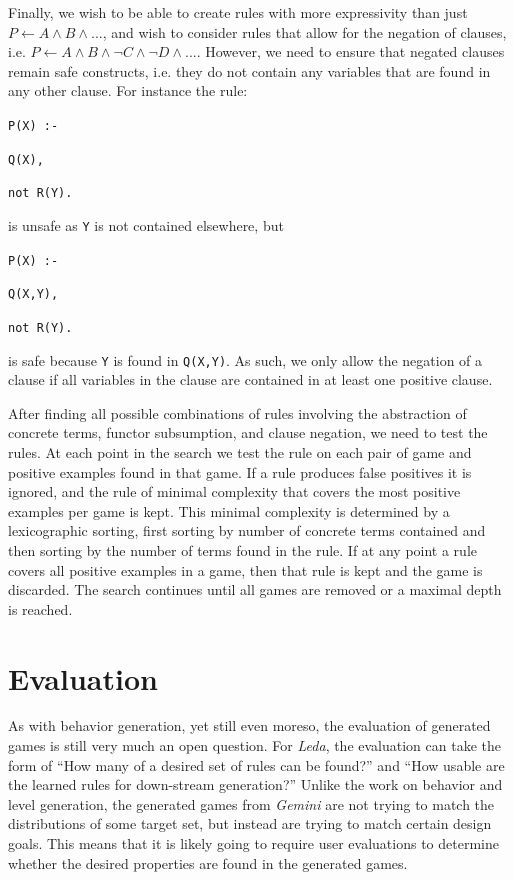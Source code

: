 \documentclass[12pt]{report}
\begin{document}
Finally, we wish to be able to create rules with more expressivity than just $P \leftarrow A \land B \land ...$, and wish to consider rules that allow for the negation of clauses, i.e. $P \leftarrow A \land B \land \lnot C \land \lnot D \land ...$.  However, we need to ensure that negated clauses remain safe constructs, i.e. they do not contain any variables that are found in any other clause.  For instance the rule:

\noindent \texttt{P(X) :- }

\texttt{Q(X),}

\texttt{not R(Y).}

\noindent is unsafe as \texttt{Y} is not contained elsewhere, but

\noindent \texttt{P(X) :- }

\texttt{Q(X,Y),}

\texttt{not R(Y).}

\noindent is safe because \texttt{Y} is found in \texttt{Q(X,Y)}.  As such, we only allow the negation of a clause if all variables in the clause are contained in at least one positive clause.

After finding all possible combinations of rules involving the abstraction of concrete terms, functor subsumption, and clause negation, we need to test the rules.  At each point in the search we test the rule on each pair of game and positive examples found in that game. If a rule produces false positives it is ignored, and the rule of minimal complexity that covers the most positive examples per game is kept.  This minimal complexity is determined by a lexicographic sorting, first sorting by number of concrete terms contained and then sorting by the number of terms found in the rule. If at any point a rule covers all positive examples in a game, then that rule is kept and the game is discarded.  The search continues until all games are removed or a maximal depth is reached.    

\section*{Evaluation}

As with behavior generation, yet still even moreso, the evaluation of generated games is still very much an open question.  For \textit{Leda}, the evaluation can take the form of ``How many of a desired set of rules can be found?'' and ``How usable are the learned rules for down-stream generation?''  Unlike the work on behavior and level generation, the generated games from \textit{Gemini} are not trying to match the distributions of some target set, but instead are trying to match certain design goals.  This means that it is likely going to require user evaluations to determine whether the desired properties are found in the generated games.
\end{document}
